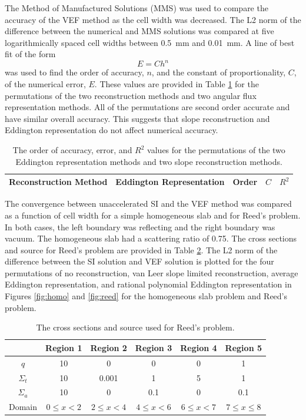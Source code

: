 The Method of Manufactured Solutions (MMS) was used to compare the accuracy of the VEF method as the cell width was decreased. The L2 norm of the difference between the numerical and MMS solutions was compared at five logarithmically spaced cell widths between \SI{0.5}{mm} and \SI{0.01}{mm}. A line of best fit of the form 
	\begin{equation}
		E = C h^n
	\end{equation}
was used to find the order of accuracy, $n$, and the constant of proportionality, $C$, of the numerical error, $E$. These values are provided in Table \ref{tab:mms} for the permutations of the two reconstruction methods and two angular flux representation methods. All of the permutations are second order accurate and have similar overall accuracy. This suggests that slope reconstruction and Eddington representation do not affect numerical accuracy. 

	\begin{table} \centering
	\begin{tabular}{|c|c|c|c|c|}
	\hline
	\hline
	Reconstruction Method & Eddington Representation & Order & $C$ & $R^2$ \\ 
	\hline
		
	\hline
	\hline
	\end{tabular}
	\caption{The order of accuracy, error, and $R^2$ values for the permutations of the two Eddington representation methods and two slope reconstruction methods. }
	\label{tab:mms}
	\end{table}

The convergence between unaccelerated SI and the VEF method was compared as a function of cell width for a simple homogeneous slab and for Reed's problem. In both cases, the left boundary was reflecting and the right boundary was vacuum. The homogeneous slab had a scattering ratio of 0.75. The cross sections and source for Reed's problem are provided in Table \ref{tab:reedXS}. The L2 norm of the difference between the SI solution and VEF solution is plotted for the four permutations of no reconstruction, van Leer slope limited reconstruction, average Eddington representation, and rational polynomial Eddington representation in Figures \ref{fig:homo} and \ref{fig:reed} for the homogeneous slab problem and Reed's problem. 

	\begin{table} \centering
		\begin{tabular}{|c|c|c|c|c|c|}
			\hline
			& Region 1 & Region 2 & Region 3 & Region 4 & Region 5 \\ 
			\hline 
			$q$ & 10 & 0 & 0 & 0 & 1 \\ 
			$\Sigma_t$ & 10 & 0.001 & 1 & 5 & 1 \\ 
			$\Sigma_a$ & 10 & 0 & 0.1 & 0 & 0.1 \\ 
			\hline 
			Domain & $0 \leq x < 2$ & $2 \leq x < 4$ & $4\leq x < 6$ &
				$6 \leq x < 7$ & $7 \leq x \leq 8$\\ 
			\hline 
		\end{tabular}
		\caption{The cross sections and source used for Reed's problem.}
		\label{tab:reedXS}
	\end{table}

